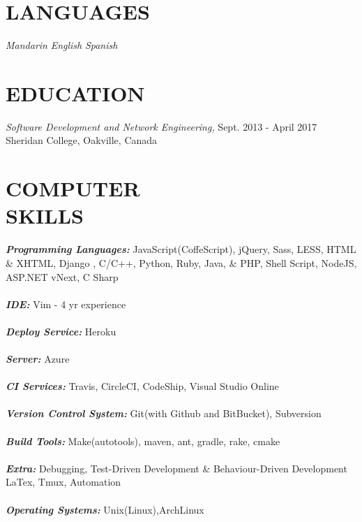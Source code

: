\documentclass[margin, 10pt]{res} %
\begin{document}
\begin{resume}

\section{LANGUAGES}
{\sl Mandarin}
{\sl English}
{\sl Spanish}

\section{EDUCATION}

{\sl Software Development and Network Engineering,} \hfill Sept. 2013 - April 2017   \\
Sheridan College, Oakville, Canada \\


\section{COMPUTER \\ SKILLS}

\textit{\textbf{Programming Languages:}} JavaScript(CoffeScript), jQuery, Sass, LESS, HTML \& XHTML, Django , C/C++, Python, Ruby, Java, \& PHP, Shell Script, NodeJS, ASP.NET vNext, C Sharp \\
\\
\textit{\textbf{IDE:}} Vim - 4 yr experience \\
\\
\textit{\textbf{Deploy Service:}} Heroku \\
\\
\textit{\textbf{Server:}} Azure \\
\\
\textit{\textbf{CI Services:}} Travis, CircleCI, CodeShip, Visual Studio Online \\
\\
\textit{\textbf{Version Control System:}} Git(with Github and BitBucket), Subversion \\
\\
\textit{\textbf{Build Tools:}} Make(autotools), maven, ant, gradle, rake, cmake \\
\\
\textit{\textbf{Extra:}} Debugging, Test-Driven Development \& Behaviour-Driven Development \\
       LaTex, Tmux, Automation \\
\\
\textit{\textbf{Operating Systems:}} Unix(Linux),ArchLinux \\


\end{resume}
\end{document}
